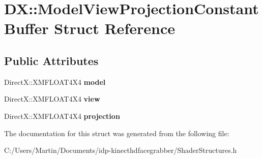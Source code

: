 \hypertarget{struct_d_x_1_1_model_view_projection_constant_buffer}{}\section{D\+X\+:\+:Model\+View\+Projection\+Constant\+Buffer Struct Reference}
\label{struct_d_x_1_1_model_view_projection_constant_buffer}
\subsection*{Public Attributes}
\begin{DoxyCompactItemize}
\item 
\hypertarget{struct_d_x_1_1_model_view_projection_constant_buffer_a18f304d9618bb2844c0d8d34ff4ea9b1}{}Direct\+X\+::\+X\+M\+F\+L\+O\+A\+T4\+X4 {\bfseries model}\label{struct_d_x_1_1_model_view_projection_constant_buffer_a18f304d9618bb2844c0d8d34ff4ea9b1}

\item 
\hypertarget{struct_d_x_1_1_model_view_projection_constant_buffer_a72d1fbb84036f5eba2004b704a57f4b5}{}Direct\+X\+::\+X\+M\+F\+L\+O\+A\+T4\+X4 {\bfseries view}\label{struct_d_x_1_1_model_view_projection_constant_buffer_a72d1fbb84036f5eba2004b704a57f4b5}

\item 
\hypertarget{struct_d_x_1_1_model_view_projection_constant_buffer_ada68b06555f7aabe36365ffcf2546c99}{}Direct\+X\+::\+X\+M\+F\+L\+O\+A\+T4\+X4 {\bfseries projection}\label{struct_d_x_1_1_model_view_projection_constant_buffer_ada68b06555f7aabe36365ffcf2546c99}

\end{DoxyCompactItemize}


The documentation for this struct was generated from the following file\+:\begin{DoxyCompactItemize}
\item 
C\+:/\+Users/\+Martin/\+Documents/idp-\/kinecthdfacegrabber/Shader\+Structures.\+h\end{DoxyCompactItemize}
